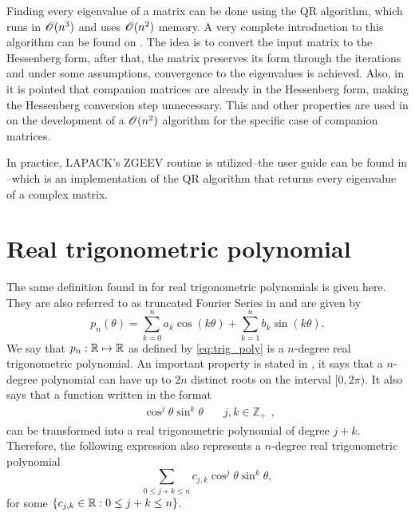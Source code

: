  Finding every eigenvalue of a matrix can be done using the QR algorithm, which runs in $\mathscr{O}(n^3)$ and uses $\mathscr{O}(n^2)$ memory. A very complete introduction to this algorithm can be found on . The idea is to convert the input matrix to the Hessenberg form, after that, the matrix preserves its form through the iterations and under some assumptions, convergence to the eigenvalues is achieved.
 Also, in  it is pointed that companion matrices are already in the Hessenberg form, making the Hessenberg conversion step unnecessary. This and other properties are used in  on the development of a $\mathscr{O}(n^2)$ algorithm for the specific case of companion matrices.
 
 In practice, LAPACK's ZGEEV routine is utilized--the user guide can be found in --which is an implementation of the QR algorithm that returns every eigenvalue of a complex matrix.
 
\section{Real trigonometric polynomial}

The same definition found in  for real trigonometric polynomials is given here. They are also referred to as truncated Fourier Series in  and are given by
\begin{equation}\label{eq:trig_poly}
p_n(\theta) = \sum_{k=0}^{n} a_k\cos(k\theta) + \sum_{k=1}^{n} b_k\sin(k\theta).
\end{equation}
We say that $p_n: \mathbb{R} \mapsto \mathbb{R}$ as defined by \autoref{eq:trig_poly} is a $n$-degree real trigonometric polynomial. An important property is stated in , it says that a $n$-degree polynomial can have up to $2n$ distinct roots on the interval $[0, 2\pi)$. It also says that a function written in the format
$$\begin{array}{cc}\cos^j{\theta}\sin^k{\theta} & \quad j, k \in \mathbb{Z}_+ \end{array},$$
can be transformed into a real trigonometric polynomial of degree $j+k$. Therefore, the following expression also represents a $n$-degree real trigonometric polynomial
\begin{equation}\label{eq:trig_poly_2}
\sum_{0 \le j+k \le n}c_{j,k}\cos^j{\theta}\sin^k{\theta},
\end{equation}
for some $\{c_{j,k} \in \mathbb{R}: 0 \le j+k \le n\}$.